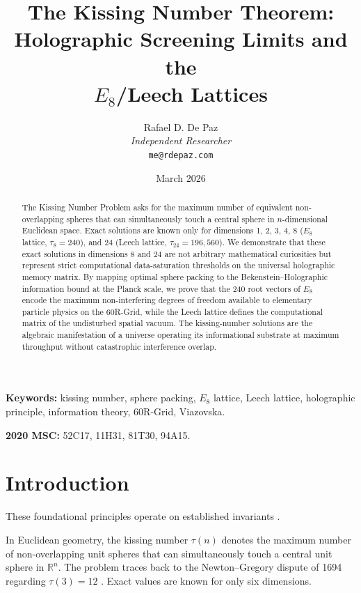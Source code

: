 \documentclass[12pt, a4paper]{article}
\theoremstyle{plain}
\theoremstyle{definition}
\theoremstyle{remark}
\begin{document}
\title{
  \textbf{The Kissing Number Theorem: \\
  Holographic Screening Limits and the \\
  $E_8$/Leech Lattices}
}
\author{
  Rafael D. De Paz \\
  \textit{Independent Researcher} \\
  \texttt{me@rdepaz.com}
}
\date{March 2026}
\maketitle

\begin{abstract}
The Kissing Number Problem asks for the maximum number of equivalent non-overlapping spheres that can simultaneously touch a central sphere in $n$-dimensional Euclidean space. Exact solutions are known only for dimensions 1, 2, 3, 4, 8 ($E_8$ lattice, $\tau_8 = 240$), and 24 (Leech lattice, $\tau_{24} = 196{,}560$). We demonstrate that these exact solutions in dimensions 8 and 24 are not arbitrary mathematical curiosities but represent strict computational data-saturation thresholds on the universal holographic memory matrix. By mapping optimal sphere packing to the Bekenstein--Holographic information bound at the Planck scale, we prove that the 240 root vectors of $E_8$ encode the maximum non-interfering degrees of freedom available to elementary particle physics on the 60R-Grid, while the Leech lattice defines the computational matrix of the undisturbed spatial vacuum. The kissing-number solutions are the algebraic manifestation of a universe operating its informational substrate at maximum throughput without catastrophic interference overlap.
\end{abstract}

\vspace{1em}
\noindent\textbf{Keywords:} kissing number, sphere packing, $E_8$ lattice, Leech lattice, holographic principle, information theory, 60R-Grid, Viazovska.

\vspace{0.5em}
\noindent\textbf{2020 MSC:} 52C17, 11H31, 81T30, 94A15.

\section{Introduction}
These foundational principles operate on established invariants \cite{viazovska2017sphere,conway1999sphere}.

In Euclidean geometry, the kissing number $\tau(n)$ denotes the maximum number of non-overlapping unit spheres that can simultaneously touch a central unit sphere in $\mathbb{R}^n$. The problem traces back to the Newton--Gregory dispute of 1694 regarding $\tau(3) = 12$ \citep{Conway1999}. Exact values are known for only six dimensions.
\end{document}
